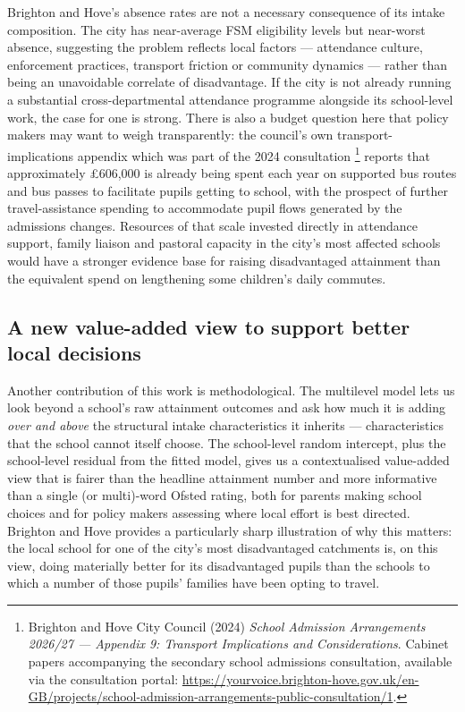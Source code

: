 \documentclass[
  12pt,
  titlepage]{article}
\begin{document}
Brighton and Hove's absence rates are not a necessary consequence of its
intake composition. The city has near-average FSM eligibility levels but
near-worst absence, suggesting the problem reflects local factors ---
attendance culture, enforcement practices, transport friction or
community dynamics --- rather than being an unavoidable correlate of
disadvantage. If the city is not already running a substantial
cross-departmental attendance programme alongside its school-level work,
the case for one is strong. There is also a budget question here that
policy makers may want to weigh transparently: the council's own
transport-implications appendix which was part of the 2024 consultation
\footnote{Brighton and Hove City Council (2024) \emph{School Admission
  Arrangements 2026/27 --- Appendix 9: Transport Implications and
  Considerations}. Cabinet papers accompanying the secondary school
  admissions consultation, available via the consultation portal:
  \url{https://yourvoice.brighton-hove.gov.uk/en-GB/projects/school-admission-arrangements-public-consultation/1}.}
reports that approximately £606,000 is already being spent each year on
supported bus routes and bus passes to facilitate pupils getting to
school, with the prospect of further travel-assistance spending to
accommodate pupil flows generated by the admissions changes. Resources
of that scale invested directly in attendance support, family liaison
and pastoral capacity in the city's most affected schools would have a
stronger evidence base for raising disadvantaged attainment than the
equivalent spend on lengthening some children's daily commutes.

\subsection{A new value-added view to support better local
decisions}\label{a-new-value-added-view-to-support-better-local-decisions}

Another contribution of this work is methodological. The multilevel
model lets us look beyond a school's raw attainment outcomes and ask how
much it is adding \emph{over and above} the structural intake
characteristics it inherits --- characteristics that the school cannot
itself choose. The school-level random intercept, plus the school-level
residual from the fitted model, gives us a contextualised value-added
view that is fairer than the headline attainment number and more
informative than a single (or multi)-word Ofsted rating, both for
parents making school choices and for policy makers assessing where
local effort is best directed. Brighton and Hove provides a particularly
sharp illustration of why this matters: the local school for one of the
city's most disadvantaged catchments is, on this view, doing materially
better for its disadvantaged pupils than the schools to which a number
of those pupils' families have been opting to travel.
\end{document}

